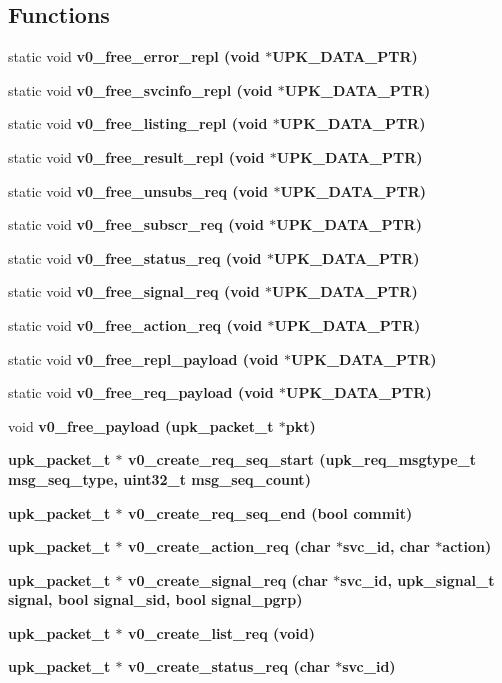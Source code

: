 \subsection*{Functions}
\begin{CompactItemize}
\item 
static void \bf{v0\_\-free\_\-error\_\-repl} (void $\ast$UPK\_\-DATA\_\-PTR)
\item 
static void \bf{v0\_\-free\_\-svcinfo\_\-repl} (void $\ast$UPK\_\-DATA\_\-PTR)
\item 
static void \bf{v0\_\-free\_\-listing\_\-repl} (void $\ast$UPK\_\-DATA\_\-PTR)
\item 
static void \bf{v0\_\-free\_\-result\_\-repl} (void $\ast$UPK\_\-DATA\_\-PTR)
\item 
static void \bf{v0\_\-free\_\-unsubs\_\-req} (void $\ast$UPK\_\-DATA\_\-PTR)
\item 
static void \bf{v0\_\-free\_\-subscr\_\-req} (void $\ast$UPK\_\-DATA\_\-PTR)
\item 
static void \bf{v0\_\-free\_\-status\_\-req} (void $\ast$UPK\_\-DATA\_\-PTR)
\item 
static void \bf{v0\_\-free\_\-signal\_\-req} (void $\ast$UPK\_\-DATA\_\-PTR)
\item 
static void \bf{v0\_\-free\_\-action\_\-req} (void $\ast$UPK\_\-DATA\_\-PTR)
\item 
static void \bf{v0\_\-free\_\-repl\_\-payload} (void $\ast$UPK\_\-DATA\_\-PTR)
\item 
static void \bf{v0\_\-free\_\-req\_\-payload} (void $\ast$UPK\_\-DATA\_\-PTR)
\item 
void \bf{v0\_\-free\_\-payload} (\bf{upk\_\-packet\_\-t} $\ast$pkt)
\item 
\bf{upk\_\-packet\_\-t} $\ast$ \bf{v0\_\-create\_\-req\_\-seq\_\-start} (\bf{upk\_\-req\_\-msgtype\_\-t} msg\_\-seq\_\-type, uint32\_\-t msg\_\-seq\_\-count)
\item 
\bf{upk\_\-packet\_\-t} $\ast$ \bf{v0\_\-create\_\-req\_\-seq\_\-end} (bool commit)
\item 
\bf{upk\_\-packet\_\-t} $\ast$ \bf{v0\_\-create\_\-action\_\-req} (char $\ast$svc\_\-id, char $\ast$action)
\item 
\bf{upk\_\-packet\_\-t} $\ast$ \bf{v0\_\-create\_\-signal\_\-req} (char $\ast$svc\_\-id, \bf{upk\_\-signal\_\-t} signal, bool signal\_\-sid, bool signal\_\-pgrp)
\item 
\bf{upk\_\-packet\_\-t} $\ast$ \bf{v0\_\-create\_\-list\_\-req} (void)
\item 
\bf{upk\_\-packet\_\-t} $\ast$ \bf{v0\_\-create\_\-status\_\-req} (char $\ast$svc\_\-id)

\end{CompactItemize}
